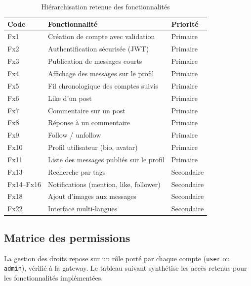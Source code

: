 \documentclass{cesi}
\begin{document}
\begin{table}[H]
\centering
\begin{tabularx}{\linewidth}{l X l}
\toprule
\textbf{Code} & \textbf{Fonctionnalité} & \textbf{Priorité} \\
\midrule
Fx1  & Création de compte avec validation        & Primaire \\
Fx2  & Authentification sécurisée (JWT)           & Primaire \\
Fx3  & Publication de messages courts             & Primaire \\
Fx4  & Affichage des messages sur le profil        & Primaire \\
Fx5  & Fil chronologique des comptes suivis        & Primaire \\
Fx6  & Like d'un post                              & Primaire \\
Fx7  & Commentaire sur un post                     & Primaire \\
Fx8  & Réponse à un commentaire                    & Primaire \\
Fx9  & Follow / unfollow                           & Primaire \\
Fx10 & Profil utilisateur (bio, avatar)             & Primaire \\
Fx11 & Liste des messages publiés sur le profil    & Primaire \\
Fx13 & Recherche par tags                          & Secondaire \\
Fx14--Fx16 & Notifications (mention, like, follower) & Secondaire \\
Fx18 & Ajout d'images aux messages                & Secondaire \\
Fx22 & Interface multi-langues                    & Secondaire \\
\bottomrule
\end{tabularx}
\caption{Hiérarchisation retenue des fonctionnalités}
\end{table}

\subsection{Matrice des permissions}

La gestion des droits repose sur un rôle porté par chaque compte (\texttt{user} ou
\texttt{admin}), vérifié à la gateway. Le tableau suivant synthétise les accès
retenus pour les fonctionnalités implémentées.
\end{document}
